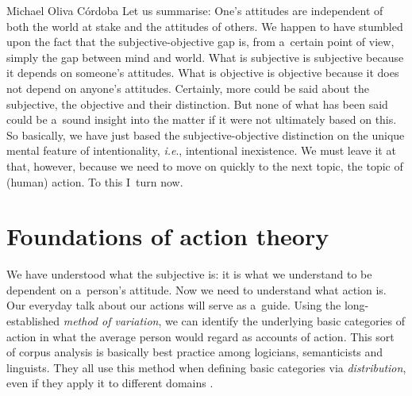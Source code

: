 \begin{artengenv}{Michael Oliva Córdoba}
Let us summarise: One's attitudes are independent of both the world at stake and the attitudes of others. We happen to have stumbled upon the fact that the subjective-objective gap is, from a~certain point of view, simply the gap between mind and world. What is subjective is subjective because it depends on someone's attitudes. What is objective is objective because it does not depend on anyone's attitudes. Certainly, more could be said about the subjective, the objective and their distinction. But none of what has been said could be a~sound insight into the matter if it were not ultimately based on this. So basically, we have just based the subjective-objective distinction on the unique mental feature of intentionality, \textit{i.e}., intentional inexistence. We must leave it at that, however, because we need to move on quickly to the next topic, the topic of (human) action. To this I~turn now.



\section{Foundations of action theory}


We have understood what the subjective is: it is what we understand to be dependent on a~person's attitude. Now we need to understand what action is. Our everyday talk about our actions will serve as a~guide. Using the long-established \textit{method of variation}, we can identify the underlying basic categories of action in what the average person would regard as accounts of action. This sort of corpus analysis is basically best practice among logicians, semanticists and linguists. They all use this method when defining basic categories via \textit{distribution}, even if they apply it to different domains 
\parencites[see, e.g.,][p.46]{burton-roberts_analysing_2016}[][p.34]{tallerman_understanding_2015}[][p.20ff]{lewis_general_1970}[][p.147]{lyons_introduction_1968}[][p.3]{ajdukiewicz_syntaktische_1935}[][p.242]{husserl_prolegomena_1913}[all anticipated by][]{frege_function_1891}[Engl. transl.][p.189]{frege_function_1960}[and][\mbox{[ Sophist 261d-262e]}]{plato_plato_1921}.%
 




\end{artengenv}
